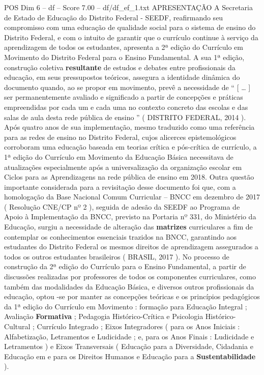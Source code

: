 \begin{textsample}{POS Dim 6 – df – Score 7.00 – df/df\_ef\_1.txt}  \label{ex:f6_pos_129}
APRESENTAÇÃO A Secretaria de Estado de Educação do Distrito Federal - SEEDF, reafirmando seu compromisso com uma educação de qualidade social para o sistema de ensino do Distrito Federal, e com o intuito de garantir que o currículo continue à serviço da aprendizagem de todos os estudantes, apresenta a 2ª edição do Currículo em Movimento do Distrito Federal para o Ensino Fundamental.
A sua 1ª edição, construção coletiva \textbf{resultante} de estudos e debates entre profissionais da educação, em seus pressupostos teóricos, assegura a identidade dinâmica do documento quando, ao se propor em movimento, prevê a necessidade de “ [ … ] ser permanentemente avaliado e significado a partir de concepções e práticas empreendidas por cada um e cada uma no contexto concreto das escolas e das salas de aula desta rede pública de ensino ” ( DISTRITO FEDERAL, 2014 ).
Após quatro anos de sua implementação, mesmo traduzido como uma referência para as redes de ensino no Distrito Federal, cujos alicerces epistemológicos corroboram uma educação baseada em teorias crítica e pós-crítica de currículo, a 1ª edição do Currículo em Movimento da Educação Básica necessitava de atualizações especialmente após a universalização da organização escolar em Ciclos para as Aprendizagens na rede pública de ensino em 2018.
Outra questão importante considerada para a revisitação desse documento foi que, com a homologação da Base Nacional Comum Curricular – BNCC em dezembro de 2017 ( Resolução CNE/CP nº 2 ), seguida de adesão da SEEDF ao Programa de Apoio à Implementação da BNCC, previsto na Portaria nº 331, do Ministério da Educação, surgiu a necessidade de alteração das \textbf{matrizes} curriculares a fim de contemplar os conhecimentos essenciais trazidos na BNCC, garantindo aos estudantes do Distrito Federal os mesmos direitos de aprendizagem assegurados a todos os outros estudantes brasileiros ( BRASIL, 2017 ).
No processo de construção da 2ª edição do Currículo para o Ensino Fundamental, a partir de discussões realizadas por professores de todos os componentes curriculares, como também das modalidades da Educação Básica, e diversos outros profissionais da educação, optou -se por manter as concepções teóricas e os princípios pedagógicos da 1ª edição do Currículo em Movimento : formação para Educação Integral ; Avaliação \textbf{Formativa} ; Pedagogia Histórico-Crítica e Psicologia Histórico-Cultural ; Currículo Integrado ; Eixos Integradores ( para os Anos Iniciais : Alfabetização, Letramentos e Ludicidade ; e, para os Anos Finais : Ludicidade e Letramentos ) e Eixos Transversais ( Educação para a Diversidade, Cidadania e Educação em e para os Direitos Humanos e Educação para a \textbf{Sustentabilidade} ).

\end{textsample}
